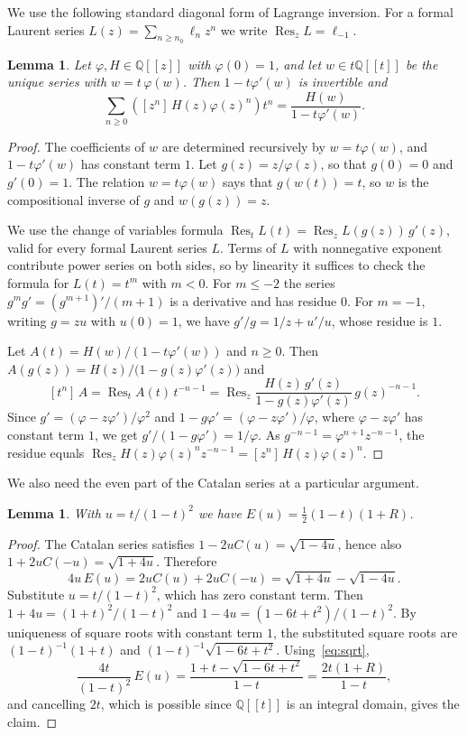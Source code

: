 \documentclass{amsart}
\newtheorem{lemma}[theorem]{Lemma}
\theoremstyle{definition}
\theoremstyle{remark}
\numberwithin{equation}{section}
\newcommand{\Q}{\mathbb{Q}}
\newcommand{\Res}{\operatorname{Res}}
\newcommand{\coef}[1]{[#1]\,}
\begin{document}
We use the following standard diagonal form of Lagrange inversion. For a formal Laurent series $L(z)=\sum_{n\ge n_0}\ell_nz^n$ we write $\Res_z L=\ell_{-1}$.

\begin{lemma}\label{lem:lagrange}
Let $\varphi,H\in\Q[[z]]$ with $\varphi(0)=1$, and let $w\in t\Q[[t]]$ be the unique series with $w=t\,\varphi(w)$. Then $1-t\varphi'(w)$ is invertible and
\[
\sum_{n\ge0}\left(\coef{z^n}H(z)\varphi(z)^n\right)t^n=\frac{H(w)}{1-t\varphi'(w)}.
\]
\end{lemma}

\begin{proof}
The coefficients of $w$ are determined recursively by $w=t\varphi(w)$, and $1-t\varphi'(w)$ has constant term $1$. Let $g(z)=z/\varphi(z)$, so that $g(0)=0$ and $g'(0)=1$. The relation $w=t\varphi(w)$ says that $g(w(t))=t$, so $w$ is the compositional inverse of $g$ and $w(g(z))=z$.

We use the change of variables formula $\Res_t L(t)=\Res_z L(g(z))\,g'(z)$, valid for every formal Laurent series $L$. Terms of $L$ with nonnegative exponent contribute power series on both sides, so by linearity it suffices to check the formula for $L(t)=t^m$ with $m<0$. For $m\le-2$ the series $g^mg'=(g^{m+1})'/(m+1)$ is a derivative and has residue $0$. For $m=-1$, writing $g=zu$ with $u(0)=1$, we have $g'/g=1/z+u'/u$, whose residue is $1$.

Let $A(t)=H(w)/(1-t\varphi'(w))$ and $n\ge0$. Then $A(g(z))=H(z)/\bigl(1-g(z)\varphi'(z)\bigr)$ and
\[
\coef{t^n}A=\Res_t A(t)\,t^{-n-1}=\Res_z\frac{H(z)\,g'(z)}{1-g(z)\varphi'(z)}\,g(z)^{-n-1}.
\]
Since $g'=(\varphi-z\varphi')/\varphi^2$ and $1-g\varphi'=(\varphi-z\varphi')/\varphi$, where $\varphi-z\varphi'$ has constant term $1$, we get $g'/(1-g\varphi')=1/\varphi$. As $g^{-n-1}=\varphi^{n+1}z^{-n-1}$, the residue equals $\Res_z H(z)\varphi(z)^nz^{-n-1}=\coef{z^n}H(z)\varphi(z)^n$.
\end{proof}

We also need the even part of the Catalan series at a particular argument.

\begin{lemma}\label{lem:catalan}
With $u=t/(1-t)^2$ we have $E(u)=\tfrac12(1-t)(1+R)$.
\end{lemma}

\begin{proof}
The Catalan series satisfies $1-2uC(u)=\sqrt{1-4u}$, hence also $1+2uC(-u)=\sqrt{1+4u}$. Therefore
\[
4u\,E(u)=2uC(u)+2uC(-u)=\sqrt{1+4u}-\sqrt{1-4u}.
\]
Substitute $u=t/(1-t)^2$, which has zero constant term. Then $1+4u=(1+t)^2/(1-t)^2$ and $1-4u=(1-6t+t^2)/(1-t)^2$. By uniqueness of square roots with constant term $1$, the substituted square roots are $(1-t)^{-1}(1+t)$ and $(1-t)^{-1}\sqrt{1-6t+t^2}$. Using~\eqref{eq:sqrt},
\[
\frac{4t}{(1-t)^2}\,E(u)=\frac{1+t-\sqrt{1-6t+t^2}}{1-t}=\frac{2t(1+R)}{1-t},
\]
and cancelling $2t$, which is possible since $\Q[[t]]$ is an integral domain, gives the claim.
\end{proof}
\end{document}
